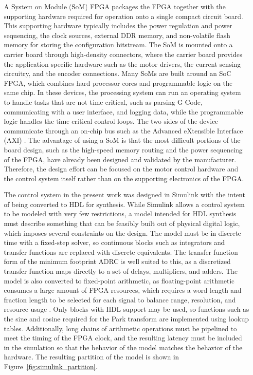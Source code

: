 A System on Module (SoM) FPGA packages the FPGA together with the supporting hardware required for operation onto a single compact circuit board. This supporting hardware typically includes the power regulation and power sequencing, the clock sources, external DDR memory, and non-volatile flash memory for storing the configuration bitstream. The SoM is mounted onto a carrier board through high-density connectors, where the carrier board provides the application-specific hardware such as the motor drivers, the current sensing circuitry, and the encoder connections. Many SoMs are built around an SoC FPGA, which combines hard processor cores and programmable logic on the same chip. In these devices, the processing system can run an operating system to handle tasks that are not time critical, such as parsing G-Code, communicating with a user interface, and logging data, while the programmable logic handles the time critical control loops. The two sides of the device communicate through an on-chip bus such as the Advanced eXtensible Interface (AXI) \cite{binfet_implementation_2026}. The advantage of using a SoM is that the most difficult portions of the board design, such as the high-speed memory routing and the power sequencing of the FPGA, have already been designed and validated by the manufacturer. Therefore, the design effort can be focused on the motor control hardware and the control system itself rather than on the supporting electronics of the FPGA.


The control system in the present work was designed in Simulink with the intent of being converted to HDL for synthesis. While Simulink allows a control system to be modeled with very few restrictions, a model intended for HDL synthesis must describe something that can be feasibly built out of physical digital logic, which imposes several constraints on the design. The model must be in discrete time with a fixed-step solver, so continuous blocks such as integrators and transfer functions are replaced with discrete equivalents. The transfer function form of the minimum footprint ADRC is well suited to this, as a discretized transfer function maps directly to a set of delays, multipliers, and adders. The model is also converted to fixed-point arithmetic, as floating-point arithmetic consumes a large amount of FPGA resources, which requires a word length and fraction length to be selected for each signal to balance range, resolution, and resource usage \cite{binfet_implementation_2026}. Only blocks with HDL support may be used, so functions such as the sine and cosine required for the Park transform are implemented using lookup tables. Additionally, long chains of arithmetic operations must be pipelined to meet the timing of the FPGA clock, and the resulting latency must be included in the simulation so that the behavior of the model matches the behavior of the hardware. The resulting partition of the model is shown in Figure~\ref{fig:simulink_partition}.

